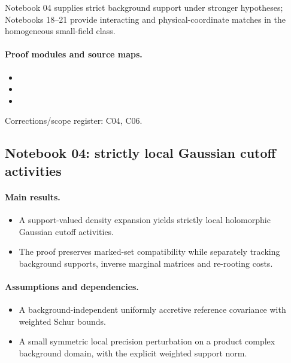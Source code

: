 \documentclass[11pt]{article}
\theoremstyle{remark}
\begin{document}
Notebook 04 supplies strict background support under stronger hypotheses; Notebooks 18--21 provide interacting and physical-coordinate matches in the homogeneous small-field class.

\paragraph{Proof modules and source maps.}
\begingroup\small
\begin{itemize}
\item {}
\item {}
\item {}
\end{itemize}
\endgroup
Corrections/scope register: C04, C06.\par

\subsection{Notebook 04: strictly local Gaussian cutoff activities}
\label{hnc-04}
\noindent{}\par

\paragraph{Main results.}
\begin{itemize}
\item A support-valued density expansion yields strictly local holomorphic Gaussian cutoff activities.
\item The proof preserves marked-set compatibility while separately tracking background supports, inverse marginal matrices and re-rooting costs.
\end{itemize}

\paragraph{Assumptions and dependencies.}
\begin{itemize}
\item A background-independent uniformly accretive reference covariance with weighted Schur bounds.
\item A small symmetric local precision perturbation on a product complex background domain, with the explicit weighted support norm.
\end{itemize}
\end{document}
